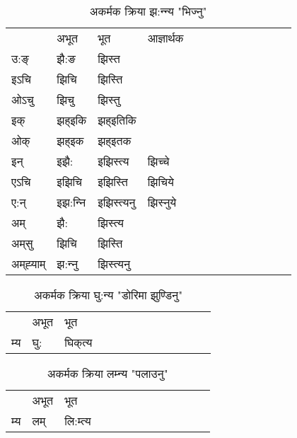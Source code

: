 \begin{table}[H]
\centering
\caption{\label{it.vi} अकर्मक क्रिया  झ:न्‍न्य  "भिज्नु"  }
\begin{tabular}{l|l|l|l|l|l|l|l|l|l|l|l|l}  \toprule
&अभूत & भूत & आज्ञार्थक \\ 
उ:ङ्‌ &झै:ङ &झिस्त \\ 
इऽचि &झिचि &झिस्ति   \\ 
ओऽचु &झिचु &झिस्तु   \\ 
इक् &झह्इकि &झह्इतिकि   \\ 
ओक् &झह्इक &झह्इतक   \\ 
इन् & इझै: & इझिस्त्य &झिच्‍चे  \\ 
एऽचि & इझिचि & इझिस्ति &झिचिये    \\ 
ए:न् & इझ:न्‍नि  & इझिस्त्यनु &झिस्‍नुये  \\ 
अम् & झै: & झिस्त्य   \\ 
अम्‌सु & झिचि & झिस्ति   \\ 
अम्‌ह्‍याम् & झ:न्‍नु  & झिस्त्यनु \\ 
\bottomrule
\end{tabular}
\end{table}


\begin{table}[H]
\centering
\caption{\label{ik.vi} अकर्मक क्रिया  घु:न्य  "डोरिमा झुण्डिनु"  }
\begin{tabular}{l|l|l|l|l|l|l|l|l|l|l|l|l}  \toprule
&अभूत & भूत   \\ 
म्य & घु: & घिक्‌त्य   \\ 
\bottomrule
\end{tabular}
\end{table}


\begin{table}[H]
\centering
\caption{\label{im.vi} अकर्मक क्रिया  लम्‍न्य  "पलाउनु"  }
\begin{tabular}{l|l|l|l|l|l|l|l|l|l|l|l|l}  \toprule
&अभूत & भूत   \\ 
म्य & लम् & लि:म्त्य   \\ 
\bottomrule
\end{tabular}
\end{table}


